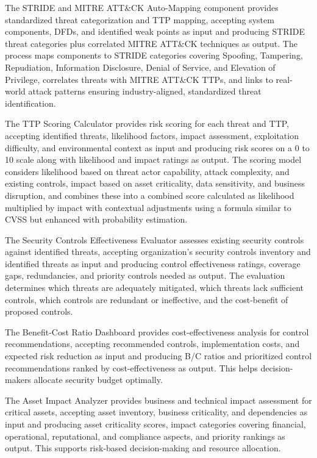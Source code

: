 \documentclass[12pt,a4paper]{report}
\begin{document}
The STRIDE and MITRE ATT\&CK Auto-Mapping component provides standardized threat categorization and TTP mapping, accepting system components, DFDs, and identified weak points as input and producing STRIDE threat categories plus correlated MITRE ATT\&CK techniques as output. The process maps components to STRIDE categories covering Spoofing, Tampering, Repudiation, Information Disclosure, Denial of Service, and Elevation of Privilege, correlates threats with MITRE ATT\&CK TTPs, and links to real-world attack patterns ensuring industry-aligned, standardized threat identification.

The TTP Scoring Calculator provides risk scoring for each threat and TTP, accepting identified threats, likelihood factors, impact assessment, exploitation difficulty, and environmental context as input and producing risk scores on a 0 to 10 scale along with likelihood and impact ratings as output. The scoring model considers likelihood based on threat actor capability, attack complexity, and existing controls, impact based on asset criticality, data sensitivity, and business disruption, and combines these into a combined score calculated as likelihood multiplied by impact with contextual adjustments using a formula similar to CVSS but enhanced with probability estimation.

The Security Controls Effectiveness Evaluator assesses existing security controls against identified threats, accepting organization's security controls inventory and identified threats as input and producing control effectiveness ratings, coverage gaps, redundancies, and priority controls needed as output. The evaluation determines which threats are adequately mitigated, which threats lack sufficient controls, which controls are redundant or ineffective, and the cost-benefit of proposed controls.

The Benefit-Cost Ratio Dashboard provides cost-effectiveness analysis for control recommendations, accepting recommended controls, implementation costs, and expected risk reduction as input and producing B/C ratios and prioritized control recommendations ranked by cost-effectiveness as output. This helps decision-makers allocate security budget optimally.

The Asset Impact Analyzer provides business and technical impact assessment for critical assets, accepting asset inventory, business criticality, and dependencies as input and producing asset criticality scores, impact categories covering financial, operational, reputational, and compliance aspects, and priority rankings as output. This supports risk-based decision-making and resource allocation.
\end{document}
